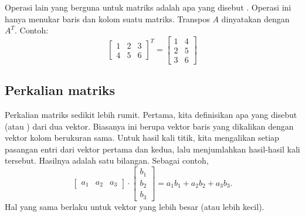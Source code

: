Operasi lain yang berguna untuk matriks adalah apa yang disebut
\emph{}.  Operasi ini hanya menukar baris dan kolom suatu
matriks.
Transpos $A$ dinyatakan dengan $A^T$.  Contoh:
\begin{equation*}
\begin{bmatrix}
1 & 2 & 3 \\
4 & 5 & 6
\end{bmatrix}^T =
\begin{bmatrix}
1 & 4 \\
2 & 5 \\
3 & 6
\end{bmatrix}
\end{equation*}

\subsection{Perkalian matriks}

Perkalian matriks sedikit lebih rumit.
Pertama, kita definisikan apa yang disebut
\emph{} (atau \emph{}) dari dua vektor.
Biasanya ini berupa vektor baris yang dikalikan
dengan vektor kolom berukuran sama.  Untuk hasil kali titik,
kita mengalikan
setiap pasangan entri dari vektor pertama dan kedua, lalu menjumlahkan
hasil-hasil kali tersebut.  Hasilnya adalah satu bilangan.
Sebagai contoh,
\begin{equation*}
\begin{bmatrix}
a_1 & a_2 & a_3
\end{bmatrix}
\cdot
\begin{bmatrix}
b_1 \\
b_2 \\
b_3
\end{bmatrix}
= a_1 b_1 + a_2 b_2 + a_3 b_3 .
\end{equation*}
Hal yang sama berlaku untuk vektor yang lebih besar (atau lebih kecil).

